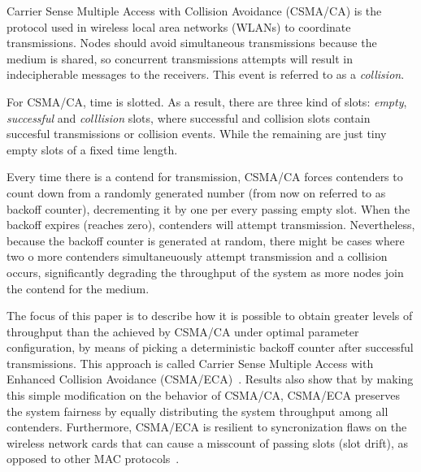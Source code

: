 Carrier Sense Multiple Access with Collision Avoidance (CSMA/CA) is the protocol used in wireless local area networks (WLANs) to coordinate transmissions. Nodes should avoid simultaneous transmissions because the medium is shared, so concurrent transmissions attempts will result in indecipherable messages to the receivers. This event is referred to as a \emph{collision}. 

For CSMA/CA, time is slotted. As a result, there are three kind of slots: \emph{empty}, \emph{successful} and \emph{colllision} slots, where successful and collision slots contain succesful transmissions or collision events. While the remaining are just tiny empty slots of a fixed time length.

Every time there is a contend for transmission, CSMA/CA forces contenders to count down from a randomly generated number (from now on referred to as backoff counter), decrementing it by one per every passing empty slot. When the backoff expires (reaches zero), contenders will attempt transmission. Nevertheless, because the backoff counter is generated at random, there might be cases where two o more contenders simultaneuously attempt transmission and a collision occurs, significantly degrading the throughput of the system as more nodes join the contend for the medium.

The focus of this paper is to describe how it is possible to obtain greater levels of throughput than the achieved by CSMA/CA under optimal parameter configuration, by means of picking a deterministic backoff counter after successful transmissions. This approach is called Carrier Sense Multiple Access with Enhanced Collision Avoidance (CSMA/ECA)~\cite{CSMA_ECA}. Results also show that by making this simple modification on the behavior of CSMA/CA, CSMA/ECA preserves the system fairness by equally distributing the system throughput among all contenders. Furthermore, CSMA/ECA is resilient to syncronization flaws on the wireless network cards that can cause a misscount of passing slots (slot drift), as opposed to other MAC protocols~\cite{slotDrift}.
